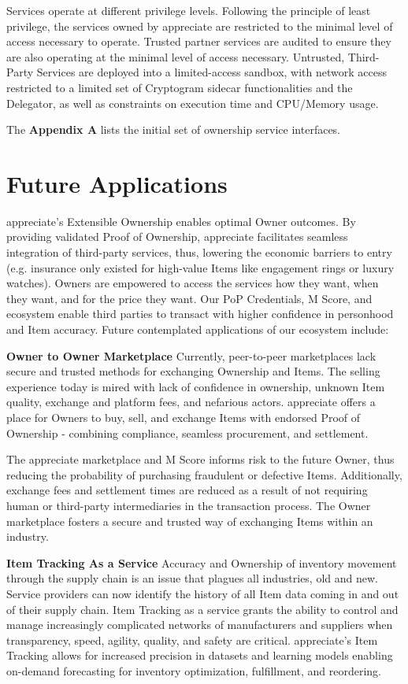 \documentclass[a4paper,onecolumn, 10.5pt]{article}
\begin{document}
Services operate at different privilege levels. Following the principle of least privilege, the services owned by appreciate are restricted to the minimal level of access necessary to operate. Trusted partner services are audited to ensure they are also operating at the minimal level of access necessary. Untrusted, Third-Party Services are deployed into a limited-access sandbox, with network access restricted to a limited set of Cryptogram sidecar functionalities and the Delegator, as well as constraints on execution time and CPU/Memory usage.

The \textbf{Appendix A} lists the initial set of ownership service interfaces.

\section{Future Applications}

appreciate’s Extensible Ownership enables optimal Owner outcomes. By providing validated Proof of Ownership, appreciate facilitates seamless integration of third-party services, thus, lowering the economic barriers to entry (e.g. insurance only existed for high-value Items like engagement rings or luxury watches). Owners are empowered to access the services how they want, when they want, and for the price they want. Our PoP Credentials, M Score, and ecosystem enable third parties to transact with higher confidence in personhood and Item accuracy. Future contemplated applications of our ecosystem include:

\textbf{Owner to Owner Marketplace} \hfill \break
Currently, peer-to-peer marketplaces lack secure and trusted methods for exchanging Ownership and Items. The selling experience today is mired with lack of confidence in ownership, unknown Item quality, exchange and platform fees, and nefarious actors. appreciate offers a place for Owners to buy, sell, and exchange Items with endorsed Proof of Ownership - combining compliance, seamless procurement, and settlement. 

The appreciate marketplace and M Score informs risk to the future Owner, thus reducing the probability of purchasing fraudulent or defective Items. Additionally, exchange fees and settlement times are reduced as a result of not requiring human or third-party intermediaries in the transaction process. The Owner marketplace fosters a secure and trusted way of exchanging Items within an industry.


\textbf{Item Tracking As a Service} \hfill \break
Accuracy and Ownership of inventory movement through the supply chain is an issue that plagues all industries, old and new. Service providers can now identify the history of all Item data coming in and out of their supply chain. Item Tracking as a service grants the ability to control and manage increasingly complicated networks of manufacturers and suppliers when transparency, speed, agility, quality, and safety are critical. appreciate’s Item Tracking allows for increased precision in datasets and learning models enabling on-demand forecasting for inventory optimization, fulfillment, and reordering.
\end{document}
